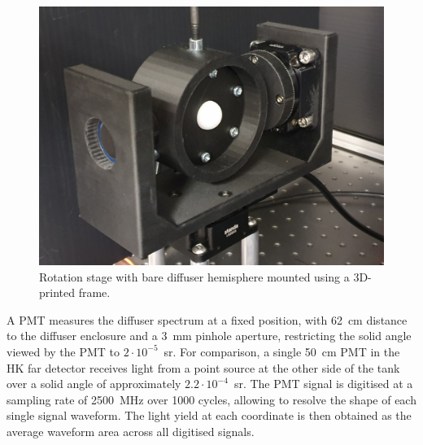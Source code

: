 \documentclass[a4paper,11pt]{article}
\begin{document}
\begin{figure}
    \centering    
    \includegraphics[height=.35\textwidth]{bare_scan_setup.jpg}%
    \caption{Rotation stage with bare diffuser hemisphere mounted using a 3D-printed frame.} 
    \label{fig:difftest_rotstage}
\end{figure}

A PMT measures the diffuser spectrum at a fixed position, with 62~cm distance to the diffuser enclosure and a 3~mm pinhole aperture, restricting the solid angle viewed by the PMT to $2\cdot10^{-5}$~sr. For comparison, a single 50~cm PMT in the HK far detector receives light from a point source at the other side of the tank over a solid angle of approximately $2.2\cdot10^{-4}$~sr.
The PMT signal is digitised at a sampling rate of 2500~MHz over 1000 cycles, allowing to resolve the shape of each single signal waveform. The light yield at each coordinate is then obtained as the average waveform area across all digitised signals. 
\end{document}

